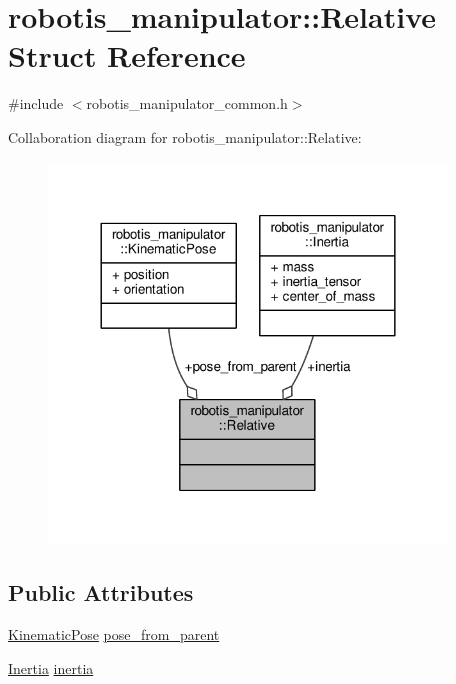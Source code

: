 \hypertarget{structrobotis__manipulator_1_1_relative}{}\section{robotis\+\_\+manipulator\+:\+:Relative Struct Reference}
\label{structrobotis__manipulator_1_1_relative}


{\ttfamily \#include $<$robotis\+\_\+manipulator\+\_\+common.\+h$>$}



Collaboration diagram for robotis\+\_\+manipulator\+:\+:Relative\+:\nopagebreak
\begin{figure}[H]
\begin{center}
\leavevmode
\includegraphics[width=300pt]{structrobotis__manipulator_1_1_relative__coll__graph}
\end{center}
\end{figure}
\subsection*{Public Attributes}
\begin{DoxyCompactItemize}
\item 
\hyperlink{structrobotis__manipulator_1_1_kinematic_pose}{Kinematic\+Pose} \hyperlink{structrobotis__manipulator_1_1_relative_a0a5f840d8a1f1f34ebd5e285209a8660}{pose\+\_\+from\+\_\+parent}
\item 
\hyperlink{structrobotis__manipulator_1_1_inertia}{Inertia} \hyperlink{structrobotis__manipulator_1_1_relative_ad761bd6e74a48a22dedb93feed45f5db}{inertia}
\end{DoxyCompactItemize}


